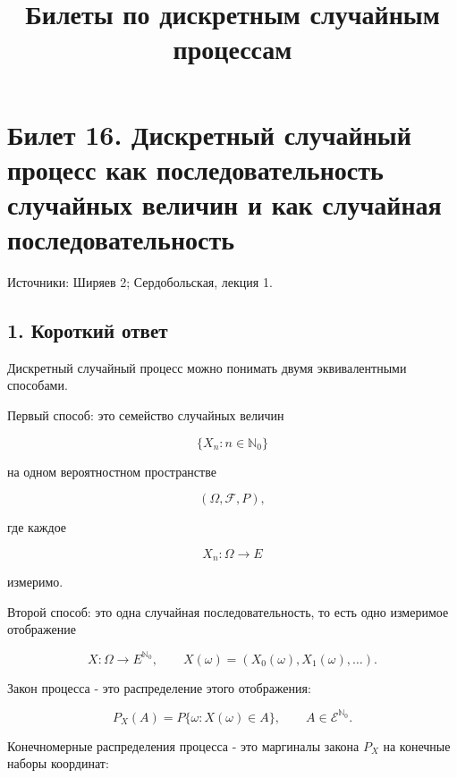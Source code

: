 \documentclass[
  11pt,
  a4paper,
]{article}
\title{Билеты по дискретным случайным процессам}
\author{}
\date{}
\begin{document}
\maketitle

\section{Билет 16. Дискретный случайный процесс как последовательность
случайных величин и как случайная
последовательность}\label{ux431ux438ux43bux435ux442-16.-ux434ux438ux441ux43aux440ux435ux442ux43dux44bux439-ux441ux43bux443ux447ux430ux439ux43dux44bux439-ux43fux440ux43eux446ux435ux441ux441-ux43aux430ux43a-ux43fux43eux441ux43bux435ux434ux43eux432ux430ux442ux435ux43bux44cux43dux43eux441ux442ux44c-ux441ux43bux443ux447ux430ux439ux43dux44bux445-ux432ux435ux43bux438ux447ux438ux43d-ux438-ux43aux430ux43a-ux441ux43bux443ux447ux430ux439ux43dux430ux44f-ux43fux43eux441ux43bux435ux434ux43eux432ux430ux442ux435ux43bux44cux43dux43eux441ux442ux44c}

Источники: Ширяев 2; Сердобольская, лекция 1.

\subsection{1. Короткий
ответ}\label{ux43aux43eux440ux43eux442ux43aux438ux439-ux43eux442ux432ux435ux442}

Дискретный случайный процесс можно понимать двумя эквивалентными
способами.

Первый способ: это семейство случайных величин

\[
\{X_n:n\in\mathbb N_0\}
\]

на одном вероятностном пространстве

\[
(\Omega,\mathcal F,P),
\]

где каждое

\[
X_n:\Omega\to E
\]

измеримо.

Второй способ: это одна случайная последовательность, то есть одно
измеримое отображение

\[
X:\Omega\to E^{\mathbb N_0},
\qquad
X(\omega)=(X_0(\omega),X_1(\omega),\ldots).
\]

Закон процесса - это распределение этого отображения:

\[
P_X(A)=P\{\omega:X(\omega)\in A\},
\qquad
A\in\mathcal E^{\mathbb N_0}.
\]

Конечномерные распределения процесса - это маргиналы закона \(P_X\) на
конечные наборы координат:
\end{document}
